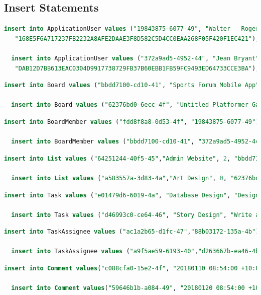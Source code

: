 \documentclass[letterpaper]{article}
\begin{document}
\subsection{Insert Statements}
\begin{lstlisting}[language=SQL, caption=ApplicationUser Insert Statements]
  insert into ApplicationUser values ("19843875-6077-49", "Walter	Rogers",
   "168E5F6A717237FB2232A8AFE2DAAE3F8D582C5D4CC0EAA268F05F420F1EC421");

  insert into ApplicationUser values ("372a9ad5-4952-44", "Jean Bryant",
   "DAB12D7BB613EAC0304D9917738729FB37B60EBB1FB59FC9493ED64733CCE3BA");
\end{lstlisting}
\begin{lstlisting}[language=SQL, caption=Board Insert Statements]
  insert into Board values ("bbdd7100-cd10-41", "Sports Forum Mobile App", "19843875-6077-49");

  insert into Board values ("62376bd0-6ecc-4f", "Untitled Platformer Game", "372a9ad5-4952-44");
\end{lstlisting}
\begin{lstlisting}[language=SQL, caption=BoardMember Insert Statements]
  insert into BoardMember values ("fdd8f8a8-0d53-4f", "19843875-6077-49");

  insert into BoardMember values ("bbdd7100-cd10-41", "372a9ad5-4952-44");
\end{lstlisting}
\begin{lstlisting}[language=SQL, caption=List Insert Statements]
  insert into List values ("64251244-40f5-45","Admin Website", 2, "bbdd7100-cd10-41");

  insert into List values ("a583557a-3d83-4a","Art Design", 0, "62376bd0-6ecc-4f");
\end{lstlisting}
\begin{lstlisting}[language=SQL, caption=Task Insert Statements]
  insert into Task values ("e01479d6-6019-4a", "Database Design", "Design a robust database schema for storing all the data in our app.", "20180120 09:00:00 +10:00", "0e72d679-da23-41");

  insert into Task values ("d46993c0-ce64-46", "Story Design", "Write a fun story for the game.", "20180620 09:00:00 +10:00", "a583557a-3d83-4a");

\end{lstlisting}
\begin{lstlisting}[language=SQL, caption=TaskAssignee Insert Statements]
  insert into TaskAssignee values ("ac1a2b65-d1fc-47","88b03172-135a-4b");

  insert into TaskAssignee values ("a9f5ae59-6193-40","d263667b-ea46-4b");
\end{lstlisting}
\begin{lstlisting}[language=SQL, caption=Comment Insert Statements]
  insert into Comment values("c088cfa0-15e2-4f", "20180110 08:54:00 +10:00", "I'm probably going to need some help with this.", "e01479d6-6019-4a", "372a9ad5-4952-44");

  insert into Comment values("59646b1b-a084-49", "20180120 08:54:00 +10:00", "So I'm thinking our game has a mario-like character - but green.", "a9f5ae59-6193-40", "d263667b-ea46-4b");
\end{lstlisting}
\end{document}
